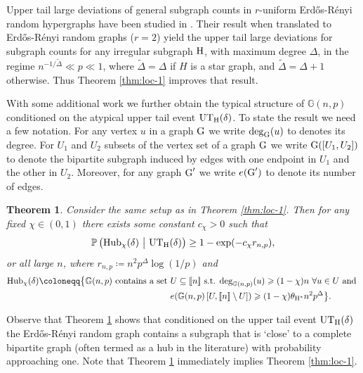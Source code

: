 \documentclass[a4paper,11pt,english,reqno]{amsart}
\numberwithin{equation}{section}
\renewcommand{\geq}{\geqslant}
\newcommand{\UTH}{\textup{UT}_{\textup{H}}(\delta)}
\newcommand{\uH}{\textup{H}}
\renewcommand{\P}{\mathbb{P}}
\newcommand{\G}{\mathbb{G}}
\newcommand{\tu}[1]{\textup{#1}}
\newcommand{\set}[1]{[\![#1]\!]}
\newtheorem{theorem}{Theorem}[section]
\begin{document}
	
	Upper tail large deviations of general subgraph counts in $r$-uniform Erd\H{o}s-R\'enyi random hypergraphs have been studied in \cite{CDP}. Their result when translated to Erd\H{o}s-R\'enyi random graphs ($r=2$) yield the upper tail large deviations for subgraph counts for any irregular subgraph $\uH$, with maximum degree $\Delta$, in the regime $n^{-1/\widetilde \Delta} \ll p \ll 1$, where $\widetilde \Delta = \Delta$ if $H$ is a star graph, and $\widetilde \Delta = \Delta +1$ otherwise. 
	Thus Theorem \ref{thm:loc-1} improves that result.  
	
	With some additional work we further obtain the typical structure of $\G(n,p)$ conditioned on the atypical upper tail event $\UTH$. To state the result we need a few notation. For any vertex $u$ in a graph $\tu{G}$ we write $\deg_{\tu{G}}(u)$ to denotes its degree. For $U_1$ and $U_2$ subsets of the vertex set of a graph $\tu{G}$ we write $\tu{G}([U_1,U_2])$ to denote the bipartite subgraph induced by edges with one endpoint in $U_1$ and the other in $U_2$. Moreover, for any graph $\tu{G}'$ we write $e(\tu{G}')$ to denote its number of edges. %
	
	\begin{theorem}
		\label{cond_struc:loc-1}
		Consider the same setup as in Theorem \ref{thm:loc-1}.  Then for any fixed $\chi\in (0,1)$ there exists some constant $c_\chi >0$ such that
		\begin{equation*}
			\P \left(\tu{Hub}_\chi(\delta)\ \big|\ \UTH\right) \ge 1 - \exp(-c_\chi r_{n,p}),
		\end{equation*} 
		or all large $n$, where $r_{n,p} \coloneqq n^2 p^\Delta \log(1/p)$ and
		\begin{equation}
			\label{Hub:defn}
			\begin{aligned}
				\tu{Hub}_\chi(\delta)\coloneqq \big\{\G(n,p)\tu{ contains a set } &U\subseteq \set{n} \tu{ s.t. } \tu{deg}_{\G(n,p)}(u)\geq (1-\chi)n\ \forall u\in U \tu{ and } \\
				&e({\G(n,p)}\left[U,\set{n}\setminus U\right])\geq (1-\chi)\theta_{\uH^{*}}n^{2}p^{\Delta}\big\}.
			\end{aligned}
		\end{equation}
		
	\end{theorem}
	
	Observe that Theorem \ref{cond_struc:loc-1} shows that conditioned on the upper tail event $\UTH$ the Erd\H{o}s-R\'enyi random graph contains a subgraph that is `close' to a complete bipartite graph (often termed as a hub in the literature) with probability approaching one. Note that Theorem \ref{cond_struc:loc-1} immediately implies Theorem \ref{thm:loc-1}.
	
\end{document}
